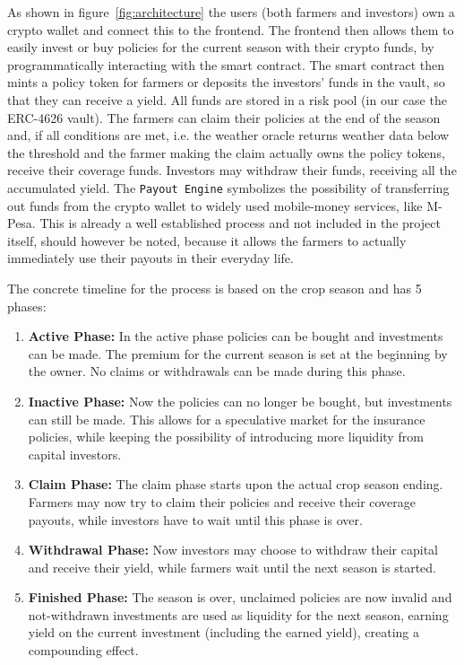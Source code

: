 \documentclass[11pt,a4paper]{article}
\begin{document}
		As shown in figure~\ref{fig:architecture} the users (both farmers and investors) own a crypto wallet and connect this to the frontend.
		The frontend then allows them to easily invest or buy policies for the current season with their crypto funds, by programmatically interacting with the smart contract.
		The smart contract then mints a policy token for farmers or deposits the investors' funds in the vault, so that they can receive a yield.
		All funds are stored in a risk pool (in our case the ERC-4626 vault).
		The farmers can claim their policies at the end of the season and, if all conditions are met, i.e. the weather oracle returns weather data below the threshold and the farmer making the claim actually owns the policy tokens, receive their coverage funds.
		Investors may withdraw their funds, receiving all the accumulated yield.
		The \texttt{Payout Engine} symbolizes the possibility of transferring out funds from the crypto wallet to widely used mobile-money services, like M-Pesa.
		This is already a well established process and not included in the project itself, should however be noted, because it allows the farmers to actually immediately use their payouts in their everyday life.

		The concrete timeline for the process is based on the crop season and has 5 phases:
		\begin{enumerate}
			\item \textbf{Active Phase:} In the active phase policies can be bought and investments can be made.
				The premium for the current season is set at the beginning by the owner.
				No claims or withdrawals can be made during this phase.
			\item \textbf{Inactive Phase:} Now the policies can no longer be bought, but investments can still be made.
				This allows for a speculative market for the insurance policies, while keeping the possibility of introducing more liquidity from capital investors.
			\item \textbf{Claim Phase:} The claim phase starts upon the actual crop season ending.
				Farmers may now try to claim their policies and receive their coverage payouts, while investors have to wait until this phase is over.
			\item \textbf{Withdrawal Phase:} Now investors may choose to withdraw their capital and receive their yield, while farmers wait until the next season is started.
			\item \textbf{Finished Phase:} The season is over, unclaimed policies are now invalid and not-withdrawn investments are used as liquidity for the next season, earning yield on the current investment (including the earned yield), creating a compounding effect.
				\label{enum:phases}
		\end{enumerate}
\end{document}
